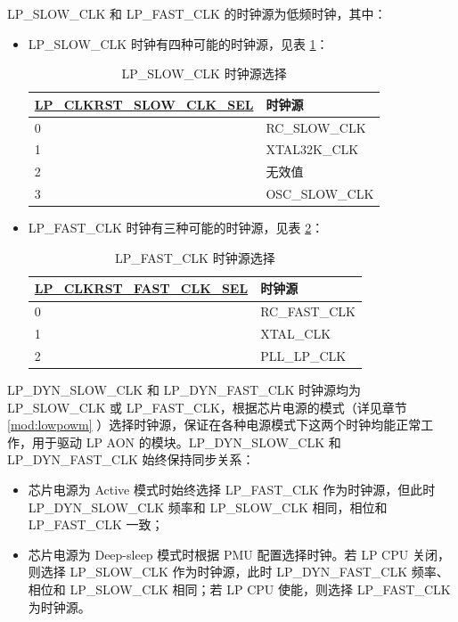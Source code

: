 \documentclass[main\_\_CN.tex]{subfiles}
\begin{document}
LP\_SLOW\_CLK 和 LP\_FAST\_CLK 的时钟源为低频时钟，其中：
\begin{itemize}
    \item LP\_SLOW\_CLK 时钟有四种可能的时钟源，见表 \ref{tab:lp-slow-clk-src}：

        \begin{longtable}[c]{|p{6cm}|p{7cm}| }
           \caption{LP\_SLOW\_CLK 时钟源选择}
    		\label{tab:lp-slow-clk-src} \\
    	    \hline
            \rowcolor{lightgray}
            \textbf{\hyperref[fielddesc:LPCLKRSTSLOWCLKSEL]{LP\_CLKRST\_SLOW\_CLK\_SEL}} & \textbf{时钟源} \\
            \hline
            0 & RC\_SLOW\_CLK \\\hline
            1 & XTAL32K\_CLK \\\hline
            2 & 无效值 \\\hline
            3 & OSC\_SLOW\_CLK \\\hline
        \end{longtable}

    \item LP\_FAST\_CLK 时钟有三种可能的时钟源，见表 \ref{tab:lp-fast-clk-src}：

        \begin{longtable}[c]{|p{6cm}|p{7cm}| }
           \caption{LP\_FAST\_CLK 时钟源选择}
    		\label{tab:lp-fast-clk-src} \\
    	    \hline
            \rowcolor{lightgray}
            \textbf{\hyperref[fielddesc:LPCLKRSTFASTCLKSEL]{LP\_CLKRST\_FAST\_CLK\_SEL}} & \textbf{时钟源} \\
            \hline
            0 & RC\_FAST\_CLK \\\hline
            1 & XTAL\_CLK \\\hline
            2 & PLL\_LP\_CLK \\\hline
        \end{longtable}

\end{itemize}


LP\_DYN\_SLOW\_CLK 和 LP\_DYN\_FAST\_CLK 时钟源均为 LP\_SLOW\_CLK 或 LP\_FAST\_CLK，根据芯片电源的模式（详见章节 \ref{mod:lowpowm} \textit{}）选择时钟源，保证在各种电源模式下这两个时钟均能正常工作，用于驱动 LP AON 的模块。LP\_DYN\_SLOW\_CLK 和 LP\_DYN\_FAST\_CLK 始终保持同步关系：
\begin{itemize}
    \item 芯片电源为 Active 模式时始终选择 LP\_FAST\_CLK 作为时钟源，但此时 LP\_DYN\_SLOW\_CLK 频率和 LP\_SLOW\_CLK 相同，相位和 LP\_FAST\_CLK 一致；
    \item 芯片电源为 Deep-sleep 模式时根据 PMU 配置选择时钟。若 LP CPU 关闭，则选择 LP\_SLOW\_CLK 作为时钟源，此时 LP\_DYN\_FAST\_CLK 频率、相位和 LP\_SLOW\_CLK 相同；若 LP CPU 使能，则选择 LP\_FAST\_CLK 为时钟源。
\end{itemize}
\end{document}
